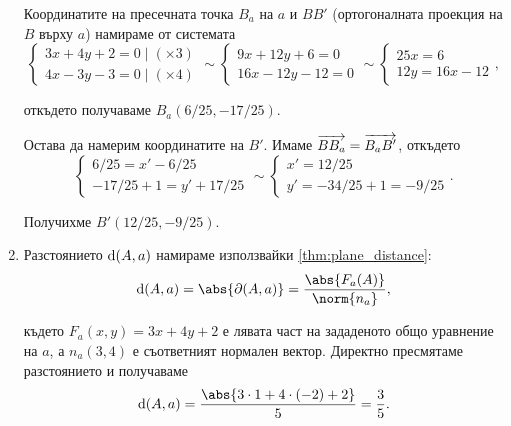 \documentclass{../../common/topic}
\begin{document}
\begin{solution}
\begin{enumerate}[label=\alph*)]
    Координатите на пресечната точка \( B_a \) на \( a \) и \( BB' \) (ортогоналната проекция на \( B \) върху \( a \)) намираме от системата
    \begin{equation*}
      \begin{cases}
        3x + 4y + 2 = 0 \mid (\times 3) \\
        4x - 3y - 3 = 0 \mid (\times 4)
      \end{cases}
      \sim
      \begin{cases}
        9x + 12y + 6 = 0 \\
        16x - 12y - 12 = 0
      \end{cases}
      \sim
      \begin{cases}
        25x = 6 \\
        12y = 16x - 12
      \end{cases},
    \end{equation*}

    откъдето получаваме \( B_a(6/25, -17/25) \).

    Остава да намерим координатите на \( B' \). Имаме \( \overrightarrow{BB_a} = \overrightarrow{B_a B'} \), откъдето
    \begin{equation*}
      \begin{cases}
        6/25 = x' - 6/25 \\
        -17/25 + 1 = y' + 17/25
      \end{cases}
      \sim
      \begin{cases}
        x' = 12/25 \\
        y' = -34/25 + 1 = -9/25
      \end{cases}.
    \end{equation*}

    Получихме \( B'(12/25, -9/25) \).

    \item Разстоянието \( \operatorname{d}(A, a) \) намираме използвайки \cref{thm:plane_distance}:
    \begin{equation*}
      \dist(A, a) = \abs{\partial(A, a)} = \frac {\abs{F_a(A)}} {\norm{n_a}},
    \end{equation*}

    където \( F_a(x, y) = 3x + 4y + 2 \) е лявата част на зададеното общо уравнение на \( a \), а \( n_a(3, 4) \) е съответният нормален вектор. Директно пресмятаме разстоянието и получаваме
    \begin{equation*}
      \dist(A, a) = \frac {\abs{3 \cdot 1 + 4 \cdot (-2) + 2}} 5 = \frac 3 5.
    \end{equation*}


\end{enumerate}
\end{solution}
\end{document}
